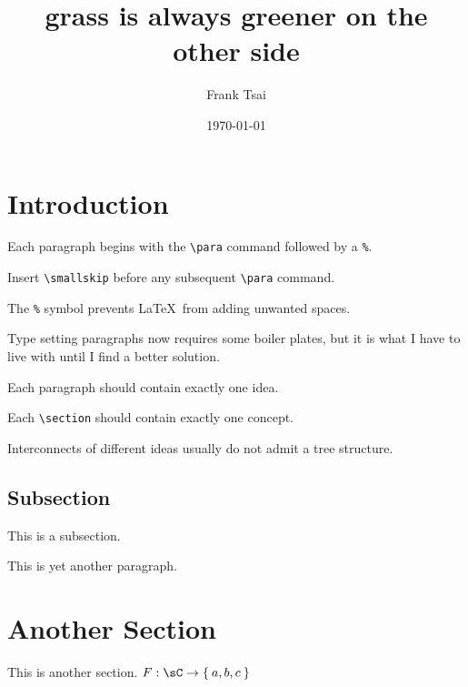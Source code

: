 \documentclass{zett}
\title{grass is always greener on the other side}
\author{Frank Tsai}
\date{\today}
\begin{document}
\maketitle
\tableofcontents

\section{Introduction}
\label{sec:introduction}

\para\label{para:the-para-command}%
Each paragraph begins with the \verb|\para| command followed by a \verb|%|.

\smallskip
\para%
Insert \verb|\smallskip| before any subsequent \verb|\para| command.

\smallskip
\para%
The \verb|%| symbol prevents \LaTeX~from adding unwanted spaces.

\smallskip
\para%
Type setting paragraphs now requires some boiler plates, but it is what I have to live with until I find a better solution.

\smallskip
\para%
Each paragraph should contain exactly one idea.

\smallskip
\para%
Each \verb|\section| should contain exactly one concept.

\smallskip
\para%
Interconnects of different ideas usually do not admit a tree structure.


\subsection{Subsection}
\label{sec:subsection}

\para%
This is a subsection.

\smallskip
\para%
This is yet another paragraph.

\section{Another Section}
\label{sec:another-section}

\para%
This is another section.
$F : \sC \to \Set{a,b,c}$



\end{document}
